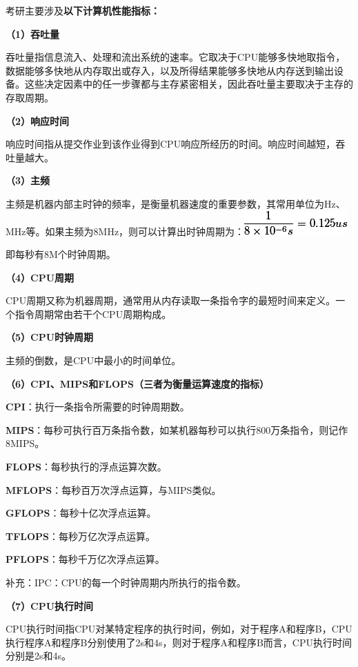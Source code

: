 考研主要涉及{\textbf{以下计算机性能指标：}}

\textbf{（1）吞吐量}

吞吐量指信息流入、处理和流出系统的速率。它取决于CPU能够多快地取指令，数据能够多快地从内存取出或存入，以及所得结果能够多快地从内存送到输出设备。这些决定因素中的任一步骤都与主存紧密相关，因此吞吐量主要取决于主存的存取周期。

\textbf{（2）响应时间}

响应时间指从提交作业到该作业得到CPU响应所经历的时间。响应时间越短，吞吐量越大。

\textbf{（3）主频}

主频是机器内部主时钟的频率，是衡量机器速度的重要参数，其常用单位为Hz、MHz等。如果主频为8MHz，则可以计算出时钟周期为：\includegraphics[width=1.55208in,height=0.36458in]{texmath/ee1758frac18times10-6s0125us}

即每秒有8M个时钟周期。

\textbf{（4）CPU周期}

CPU周期又称为机器周期，通常用从内存读取一条指令字的最短时间来定义。一个指令周期常由若干个CPU周期构成。

\textbf{（5）CPU时钟周期}

主频的倒数，是CPU中最小的时间单位。

\textbf{（6）CPI、MIPS和FLOPS（三者为衡量运算速度的指标）}

\textbf{CPI}：执行一条指令所需要的时钟周期数。

\textbf{MIPS}：每秒可执行百万条指令数，如某机器每秒可以执行800万条指令，则记作8MIPS。

\textbf{FLOPS}：每秒执行的浮点运算次数。

\textbf{MFLOPS}：每秒百万次浮点运算，与MIPS类似。

\textbf{GFLOPS}：每秒十亿次浮点运算。

\textbf{TFLOPS}：每秒万亿次浮点运算。

\textbf{PFLOPS}：每秒千万亿次浮点运算。

{补充：IPC：CPU的每一个时钟周期内所执行的指令数。}

\textbf{（7）CPU执行时间}

CPU执行时间指CPU对某特定程序的执行时间，例如，对于程序A和程序B，CPU执行程序A和程序B分别使用了2s和4s，则对于程序A和程序B而言，CPU执行时间分别是2s和4s。
